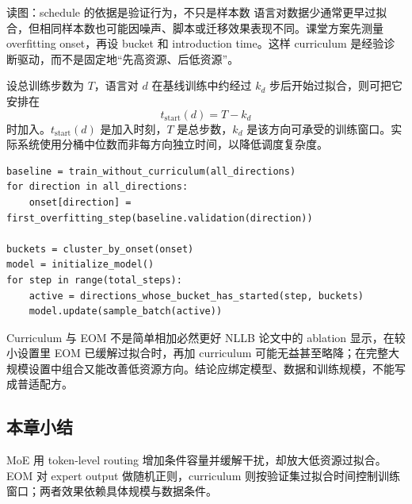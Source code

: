 \begin{knowledgebox}{读图：schedule 的依据是验证行为，不只是样本数}
语言对数据少通常更早过拟合，但相同样本数也可能因噪声、脚本或迁移效果表现不同。课堂方案先测量 overfitting onset，再设 bucket 和 introduction time。这样 curriculum 是经验诊断驱动，而不是固定地“先高资源、后低资源”。
\end{knowledgebox}

设总训练步数为 $T$，语言对 $d$ 在基线训练中约经过 $k_d$ 步后开始过拟合，则可把它安排在
\[
t_{\text{start}}(d)=T-k_d
\]
时加入。$t_{\text{start}}(d)$ 是加入时刻，$T$ 是总步数，$k_d$ 是该方向可承受的训练窗口。实际系统使用分桶中位数而非每方向独立时间，以降低调度复杂度。

\begin{lstlisting}[caption={基于验证集过拟合时间的 phased curriculum}]
baseline = train_without_curriculum(all_directions)
for direction in all_directions:
    onset[direction] = first_overfitting_step(baseline.validation(direction))

buckets = cluster_by_onset(onset)
model = initialize_model()
for step in range(total_steps):
    active = directions_whose_bucket_has_started(step, buckets)
    model.update(sample_batch(active))
\end{lstlisting}

\begin{warningbox}{Curriculum 与 EOM 不是简单相加必然更好}
NLLB 论文中的 ablation 显示，在较小设置里 EOM 已缓解过拟合时，再加 curriculum 可能无益甚至略降；在完整大规模设置中组合又能改善低资源方向。结论应绑定模型、数据和训练规模，不能写成普适配方。
\end{warningbox}

\subsection{本章小结}

MoE 用 token-level routing 增加条件容量并缓解干扰，却放大低资源过拟合。EOM 对 expert output 做随机正则，curriculum 则按验证集过拟合时间控制训练窗口；两者效果依赖具体规模与数据条件。

